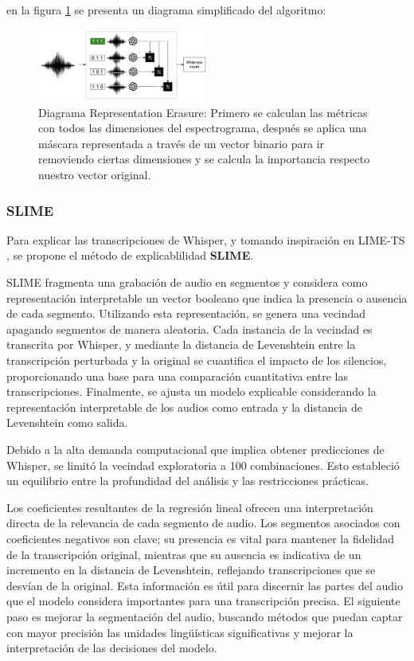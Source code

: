 \documentclass[conference]{IEEEtran}
\begin{document}
en la figura \ref{fig:re-diagram} se presenta un diagrama simplificado del algoritmo:

\begin{figure}[ht]
\centerline{\includegraphics[width=0.5\textwidth]{images/RE-Diagram.png}}
\caption{Diagrama Representation Erasure: Primero se calculan las métricas con todos las dimensiones del espectrograma, después se aplica una máscara representada a través de un vector binario para ir removiendo ciertas dimensiones y se calcula la importancia respecto nuestro vector original.}
\label{fig:re-diagram}
\end{figure}

\subsubsection{SLIME}

Para explicar las transcripciones de Whisper, y tomando inspiración en LIME-TS \cite{wu2023trust}, se propone el método de explicablilidad \textbf{SLIME}.

SLIME fragmenta una grabación de audio en segmentos y considera como representación interpretable un vector booleano que indica la presencia o ausencia de cada segmento. Utilizando esta representación, se genera una vecindad apagando segmentos de manera aleatoria. Cada instancia de la vecindad es transcrita por Whisper, y mediante la distancia de Levenshtein entre la transcripción perturbada y la original se cuantifica el impacto de los silencios, proporcionando una base para una comparación cuantitativa entre las transcripciones. Finalmente, se ajusta un modelo explicable considerando la representación interpretable de los audios como entrada y la distancia de Levenshtein como salida.

Debido a la alta demanda computacional que implica obtener predicciones de Whisper, se limitó la vecindad exploratoria a 100 combinaciones. Esto estableció un equilibrio entre la profundidad del análisis y las restricciones prácticas.

Los coeficientes resultantes de la regresión lineal ofrecen una interpretación directa de la relevancia de cada segmento de audio. Los segmentos asociados con coeficientes negativos son clave; su presencia es vital para mantener la fidelidad de la transcripción original, mientras que su ausencia es indicativa de un incremento en la distancia de Levenshtein, reflejando transcripciones que se desvían de la original. Esta información es útil para discernir las partes del audio que el modelo considera importantes para una transcripción precisa. El siguiente paso es mejorar la segmentación del audio, buscando métodos que puedan captar con mayor precisión las unidades lingüísticas significativas y mejorar la interpretación de las decisiones del modelo.
\end{document}
